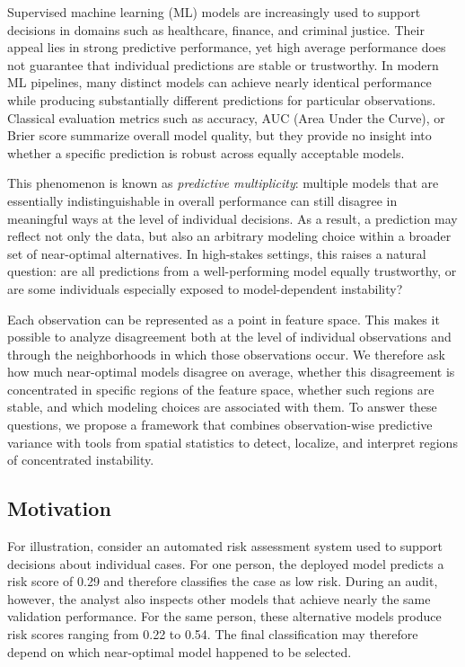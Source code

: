 Supervised machine learning (ML) models are increasingly used to support decisions in
domains such as healthcare, finance, and criminal justice. Their appeal lies in strong
predictive performance, yet high average performance does not guarantee that individual
predictions are stable or trustworthy. In modern ML pipelines, many distinct models can 
achieve nearly identical performance while producing substantially different predictions 
for particular observations. Classical evaluation metrics such as
accuracy, AUC (Area Under the Curve), or Brier score summarize overall model quality, 
but they provide no insight into whether a specific prediction is robust across equally 
acceptable models.

This phenomenon is known as \emph{predictive multiplicity}: multiple models that are
essentially indistinguishable in overall performance can still disagree in meaningful ways
at the level of individual decisions. As a result, a prediction may reflect not only the
data, but also an arbitrary modeling choice within a broader set of near-optimal
alternatives. In high-stakes settings, this raises a natural question: are all predictions
from a well-performing model equally trustworthy, or are some individuals especially
exposed to model-dependent instability?

Each observation can be represented as a point in feature space. This makes it possible to
analyze disagreement both at the level of individual observations and through the neighborhoods
in which those observations occur. We therefore ask how much near-optimal models disagree on 
average, whether this disagreement is concentrated in specific regions of the feature space,
whether such regions are stable, and which modeling choices are associated with them. 
To answer these questions, we propose a framework that combines observation-wise predictive
variance with tools from spatial statistics to detect, localize, and interpret regions of
concentrated instability.

\subsection{Motivation}

For illustration, consider an automated risk assessment system used to support decisions about individual
cases. For one person, the deployed model predicts a risk score of 0.29 and therefore
classifies the case as low risk. During an audit, however, the analyst also inspects other models that 
achieve nearly the same validation performance. For the same person, these alternative models
produce risk scores ranging from 0.22 to 0.54. The final classification may therefore depend
on which near-optimal model happened to be selected.

